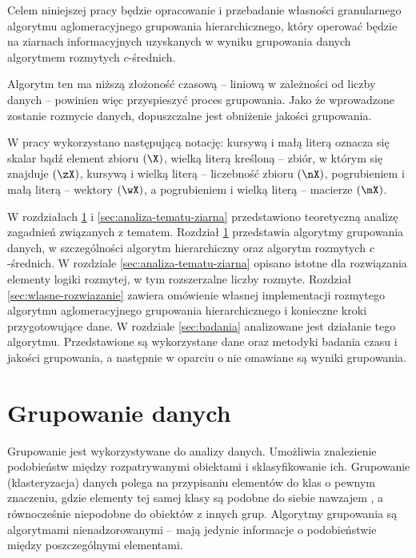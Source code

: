 \documentclass[a4paper,twoside,12pt]{book}
\begin{document}
Celem niniejszej pracy będzie opracowanie i przebadanie własności granularnego algorytmu aglomeracyjnego grupowania hierarchicznego, który operować będzie na ziarnach informacyjnych uzyskanych w wyniku grupowania danych algorytmem rozmytych $c$-średnich.

Algorytm ten ma niższą złożoność czasową -- liniową w zależności od liczby danych -- powinien więc przyspieszyć proces grupowania. Jako że wprowadzone zostanie rozmycie danych, dopuszczalne jest obniżenie jakości grupowania.

W pracy wykorzystano następującą notację: kursywą i małą literą oznacza się skalar bądź element zbioru $(\X)$, wielką literą kreśloną -- zbiór, w którym się znajduje $(\zX)$, kursywą i wielką literą -- liczebność zbioru $(\nX)$, pogrubieniem i małą literą -- wektory $(\wX)$, a pogrubieniem i wielką literą -- macierze $(\mX)$.

W rozdziałach \ref{sec:analiza-tematu-grupowanie} i \ref{sec:analiza-tematu-ziarna} przedstawiono teoretyczną analizę zagadnień związanych z tematem. Rozdział \ref{sec:analiza-tematu-grupowanie} przedstawia algorytmy grupowania danych, w szczególności algorytm hierarchiczny oraz algorytm rozmytych $c$-średnich. W rozdziale \ref{sec:analiza-tematu-ziarna} opisano istotne dla rozwiązania elementy logiki rozmytej, w tym rozszerzalne liczby rozmyte. Rozdział \ref{sec:wlasne-rozwiazanie} zawiera omówienie własnej implementacji rozmytego algorytmu aglomeracyjnego grupowania hierarchicznego i konieczne kroki przygotowujące dane. W rozdziale \ref{sec:badania} analizowane jest działanie tego algorytmu. Przedstawione są wykorzystane dane oraz metodyki badania czasu i jakości grupowania, a następnie w oparciu o nie omawiane są wyniki grupowania.


\chapter{Grupowanie danych}  %
\label{sec:analiza-tematu-grupowanie}
% 

Grupowanie jest wykorzystywane do analizy danych. Umożliwia znalezienie podobieństw między rozpatrywanymi obiektami i sklasyfikowanie ich. 
Grupowanie (klasteryzacja) danych polega na przypisaniu elementów do klas o pewnym znaczeniu, gdzie elementy tej samej klasy są podobne do siebie nawzajem
\cite{bib:fcm-for-optimizing,bib:clustering-alg-survey}, a równocześnie niepodobne do obiektów z innych grup. Algorytmy grupowania są algorytmami nienadzorowanymi -- mają jedynie informacje o podobieństwie między poszczególnymi elementami.
\end{document}
